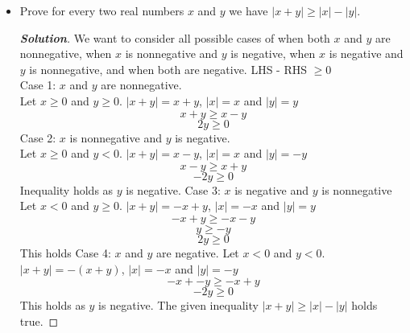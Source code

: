 \documentclass[11pt]{article}
\newenvironment{problem}[2][Problem\!]{\begin{trivlist}
\item[\hskip \labelsep {\bfseries #1}\hskip \labelsep {\bfseries #2.}]}{\end{trivlist}}
\newenvironment{solution}{\begin{proof}[\textbf{\textit{Solution}}]}{\end{proof}}
\newcommand{\abs}[1]{\left\lvert#1\right\rvert} %
\renewcommand{\geq}{\geqslant}
\begin{document}
\begin{problem}{4.2}
\begin{itemize}[itemsep=3em]
\item[(c)] Prove for every two real numbers $x$ and $y$ we have $\abs{x + y} \geq \abs{x} - \abs{y}$.
\begin{solution}
We want to consider all possible cases of when both \(x\) and \(y\) are nonnegative, when \(x\) is nonnegative and \(y\) is negative, when \(x\) is negative and \(y\) is nonnegative, and when both are negative. 
LHS - RHS \(\geq 0\)\\
Case 1: \(x\) and \(y\) are nonnegative.\\
Let \(x \geq 0\) and \(y \geq 0\).
\(|x+y| = x+y\), \(|x| = x\) and \(|y| = y\)
\[x+y \geq x-y\]
\[2y \geq 0\]
Case 2: \(x\) is nonnegative and \(y\) is negative.\\
Let \(x \geq 0\) and \(y < 0\).
\(|x+y| = x-y\), \(|x| = x\) and \(|y| = -y\)
\[x-y \geq x+y\]
\[-2y \geq 0\]
Inequality holds as \(y\) is negative.
Case 3: \(x\) is negative and \(y\) is nonnegative\\
Let \(x < 0\) and \(y \geq 0\).
\(|x+y| = -x+y\), \(|x| = -x\) and \(|y| = y\)
\[-x+y \geq -x-y\]
\[y \geq -y\]
\[2y \geq 0\]
This holds
Case 4: \(x\) and \(y\) are negative.
Let \(x < 0\) and \(y < 0\).
\(|x+y| = -(x+y)\), \(|x| = -x\) and \(|y| = -y\)
\[-x+-y \geq -x+y\]
\[-2y \geq 0\]
This holds as \(y\) is negative.
The given inequality $\abs{x + y} \geq \abs{x} - \abs{y}$ holds true.
\end{solution}

\end{itemize}
\end{problem}

\newpage  %
\end{document}

